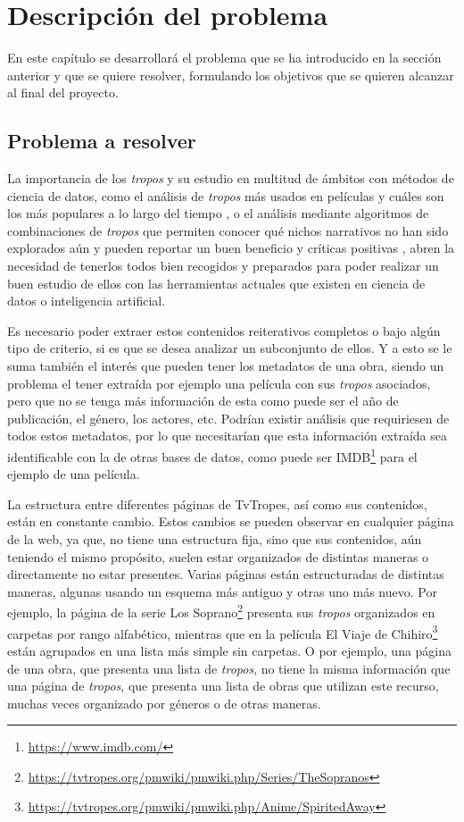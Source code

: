 \chapter{Descripción del problema}

En este capítulo se desarrollará el problema que se ha introducido en la sección
anterior y que se quiere resolver, formulando los objetivos que se quieren
alcanzar al final del proyecto.

\section{Problema a resolver}
La importancia de los \textit{tropos} y su estudio en multitud de ámbitos con
métodos de ciencia de datos, como el análisis de \textit{tropos} más usados en
películas y cuáles son los más populares a lo largo del tiempo
\cite{garcia2020tropes}, o el análisis mediante algoritmos de combinaciones de
\textit{tropos} que permiten conocer qué nichos narrativos no han sido
explorados aún y pueden reportar un buen beneficio y críticas positivas
\cite{garcia2021simpsons}, abren la necesidad de tenerlos todos bien recogidos y
preparados para poder realizar un buen estudio de ellos con las herramientas
actuales que existen en ciencia de datos o inteligencia artificial. 

Es necesario poder extraer estos contenidos reiterativos completos o bajo algún
tipo de criterio, si es que se desea analizar un subconjunto de ellos. Y a esto
se le suma también el interés que pueden tener los metadatos de una obra, siendo
un problema el tener extraída por ejemplo una película con sus \textit{tropos}
asociados, pero que no se tenga más información de esta como puede ser el año de
publicación, el género, los actores, etc. Podrían existir análisis que
requiriesen de todos estos metadatos, por lo que necesitarían que esta
información extraída sea identificable con la de otras bases de datos, como
puede ser IMDB\footnote{\url{https://www.imdb.com/}} para el ejemplo de una
película.

La estructura entre diferentes páginas de TvTropes, así como sus contenidos,
están en constante cambio. Estos cambios se pueden observar en cualquier página
de la web, ya que, no tiene una estructura fija, sino que sus contenidos, aún
teniendo el mismo propósito, suelen estar organizados de distintas maneras o
directamente no estar presentes. Varias páginas están estructuradas de distintas
maneras, algunas usando un esquema más antiguo y otras uno más nuevo. Por
ejemplo, la página de la serie Los
Soprano\footnote{\url{https://tvtropes.org/pmwiki/pmwiki.php/Series/TheSopranos}}
presenta sus \textit{tropos} organizados en carpetas por rango alfabético,
mientras que  en la película El Viaje de
Chihiro\footnote{\url{https://tvtropes.org/pmwiki/pmwiki.php/Anime/SpiritedAway}}
están agrupados en una lista más simple sin carpetas. O por ejemplo, una página
de una obra, que presenta una lista de \textit{tropos}, no tiene la misma
información que una página de \textit{tropos}, que presenta una lista de obras
que utilizan este recurso, muchas veces organizado por géneros o de otras
maneras.

